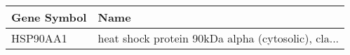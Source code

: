 \begin{tabular}{ll}
\toprule
Gene Symbol &                                               Name \\
\midrule
   HSP90AA1 & heat shock protein 90kDa alpha (cytosolic), cla... \\
\bottomrule
\end{tabular}
